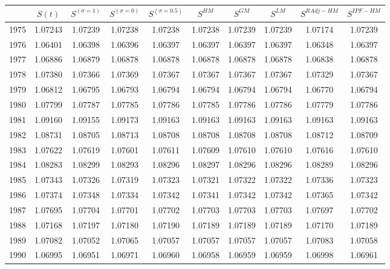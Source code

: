 \begin{tabular}{cccccccccc}
  \hline
 & $S(t)$ & $S^{(\sigma = 1)}$ & $S^{(\sigma = 0)}$ & $S^{(\sigma = 0.5)}$ & $S^{HM}$ & $S^{GM}$ & $S^{LM}$ & $S^{RAdj-HM}$ & $S^{IPF-HM}$ \\ 
  \hline
1975 & 1.07243 & 1.07239 & 1.07238 & 1.07238 & 1.07238 & 1.07239 & 1.07239 & 1.07174 & 1.07239 \\ 
  1976 & 1.06401 & 1.06398 & 1.06396 & 1.06397 & 1.06397 & 1.06397 & 1.06397 & 1.06348 & 1.06397 \\ 
  1977 & 1.06886 & 1.06879 & 1.06878 & 1.06878 & 1.06878 & 1.06878 & 1.06878 & 1.06838 & 1.06878 \\ 
  1978 & 1.07380 & 1.07366 & 1.07369 & 1.07367 & 1.07367 & 1.07367 & 1.07367 & 1.07329 & 1.07367 \\ 
  1979 & 1.06812 & 1.06795 & 1.06793 & 1.06794 & 1.06794 & 1.06794 & 1.06794 & 1.06770 & 1.06794 \\ 
  1980 & 1.07799 & 1.07787 & 1.07785 & 1.07786 & 1.07785 & 1.07786 & 1.07786 & 1.07779 & 1.07786 \\ 
  1981 & 1.09160 & 1.09155 & 1.09173 & 1.09163 & 1.09163 & 1.09163 & 1.09163 & 1.09163 & 1.09163 \\ 
  1982 & 1.08731 & 1.08705 & 1.08713 & 1.08708 & 1.08708 & 1.08708 & 1.08708 & 1.08712 & 1.08709 \\ 
  1983 & 1.07622 & 1.07619 & 1.07601 & 1.07611 & 1.07609 & 1.07610 & 1.07610 & 1.07616 & 1.07610 \\ 
  1984 & 1.08283 & 1.08299 & 1.08293 & 1.08296 & 1.08297 & 1.08296 & 1.08296 & 1.08289 & 1.08296 \\ 
  1985 & 1.07343 & 1.07326 & 1.07319 & 1.07323 & 1.07321 & 1.07322 & 1.07322 & 1.07336 & 1.07323 \\ 
  1986 & 1.07374 & 1.07348 & 1.07334 & 1.07342 & 1.07341 & 1.07342 & 1.07342 & 1.07365 & 1.07342 \\ 
  1987 & 1.07695 & 1.07704 & 1.07701 & 1.07702 & 1.07703 & 1.07703 & 1.07703 & 1.07697 & 1.07702 \\ 
  1988 & 1.07168 & 1.07197 & 1.07180 & 1.07190 & 1.07189 & 1.07189 & 1.07189 & 1.07170 & 1.07189 \\ 
  1989 & 1.07082 & 1.07052 & 1.07065 & 1.07057 & 1.07057 & 1.07057 & 1.07057 & 1.07083 & 1.07058 \\ 
  1990 & 1.06995 & 1.06951 & 1.06971 & 1.06960 & 1.06958 & 1.06959 & 1.06959 & 1.06998 & 1.06961 \\ 

\end{tabular}
